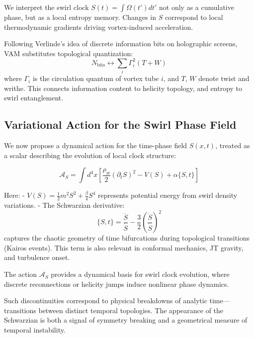 \documentclass[a4paper,12pt]{article}
\begin{document}
    We interpret the swirl clock \( S(t) = \int \Omega(t') dt' \) not only as a cumulative phase, but as a local entropy memory. Changes in \( S \) correspond to local thermodynamic gradients driving vortex-induced acceleration.

    Following Verlinde’s idea of discrete information bits on holographic screens, VAM substitutes topological quantization:
    \[
        N_{\text{bits}} \longleftrightarrow \sum_i \Gamma_i^2 (T + W)
    \]
    where \( \Gamma_i \) is the circulation quantum of vortex tube \( i \), and \( T \), \( W \) denote twist and writhe. This connects information content to helicity topology, and entropy to swirl entanglement.

    \subsection{Variational Action for the Swirl Phase Field}

    We now propose a dynamical action for the time-phase field \( S(x, t) \), treated as a scalar describing the evolution of local clock structure:

    \[
        \mathcal{A}_S = \int d^4x \left[ \frac{\rho_{\text{\ae}}}{2} (\partial_t S)^2 - V(S) + \alpha \{S, t\} \right]
    \]

    Here:
    - \( V(S) = \frac{1}{2} m^2 S^2 + \frac{\beta}{4} S^4 \) represents potential energy from swirl density variations.
    - The Schwarzian derivative:
    \[
        \{S, t\} = \frac{\dddot{S}}{\dot{S}} - \frac{3}{2} \left( \frac{\ddot{S}}{\dot{S}} \right)^2
    \]
    captures the chaotic geometry of time bifurcations during topological transitions (Kairos events). This term is also relevant in conformal mechanics, JT gravity, and turbulence onset.

    The action \(\mathcal{A}_S\) provides a dynamical basis for swirl clock evolution, where discrete reconnections or helicity jumps induce nonlinear phase dynamics.

    Such discontinuities correspond to physical breakdowns of analytic time—transitions between distinct temporal topologies. The appearance of the Schwarzian is both a signal of symmetry breaking and a geometrical measure of temporal instability.
\end{document}
